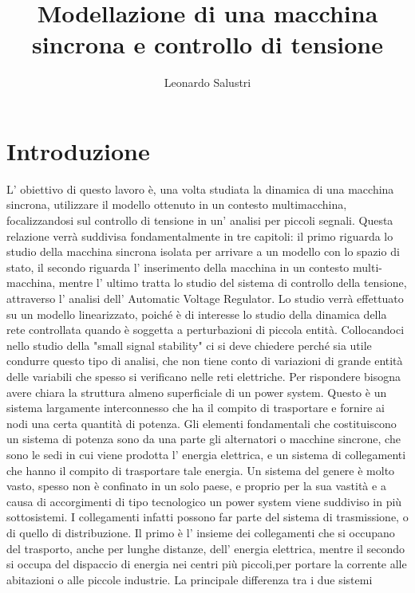 \documentclass[Lau,noexaminfo]{sapthesis}
\title{Modellazione di una macchina sincrona e controllo di tensione}
\author{Leonardo Salustri}
\begin{document}
	\frontmatter
	\maketitle
	
	\tableofcontents
	
	\setcounter{secnumdepth}{1}
	\setcounter{tocdepth}{1}
	\mainmatter
	\section*{Introduzione}
	L' obiettivo di questo lavoro è, una volta studiata la dinamica di una macchina sincrona, utilizzare il modello ottenuto in un contesto multimacchina, focalizzandosi sul controllo di tensione in un' analisi per piccoli segnali.
	Questa relazione verrà suddivisa fondamentalmente in tre capitoli: il primo riguarda lo studio della macchina sincrona isolata per arrivare a un modello con lo spazio di stato, il
	secondo riguarda l' inserimento della macchina in un contesto multi-macchina, mentre l' ultimo tratta lo studio del sistema di controllo della tensione, attraverso l' analisi dell' Automatic Voltage Regulator.
	Lo studio verrà effettuato su un modello linearizzato, poiché è di interesse lo studio della dinamica della rete controllata quando è soggetta a perturbazioni di piccola entità.
	Collocandoci nello studio della "small signal stability" ci si deve chiedere perché sia utile condurre questo tipo di analisi, che non tiene conto di variazioni di grande entità delle variabili che spesso si verificano nelle reti elettriche. Per rispondere bisogna avere chiara la struttura almeno superficiale di un power system.
	Questo è un sistema largamente interconnesso che ha il compito di trasportare e fornire ai nodi una certa quantità di potenza. Gli elementi fondamentali che costituiscono
	un sistema di potenza sono da una parte gli alternatori o macchine sincrone, che sono le sedi in cui viene prodotta l' energia elettrica, e un sistema di collegamenti
	che hanno il compito di trasportare tale energia. Un sistema del genere è molto vasto, spesso non è confinato in un solo paese, e proprio per la sua vastità e a causa di
	accorgimenti di tipo tecnologico un power system viene suddiviso in più sottosistemi. I collegamenti infatti possono far parte del sistema di trasmissione,
	o di quello di distribuzione. Il primo è l' insieme dei collegamenti che si occupano del trasporto, anche per lunghe distanze, dell' energia elettrica, mentre il secondo
	si occupa del dispaccio di energia nei centri più piccoli,per portare la corrente alle abitazioni o alle piccole industrie. La principale differenza tra i due sistemi
\end{document}
